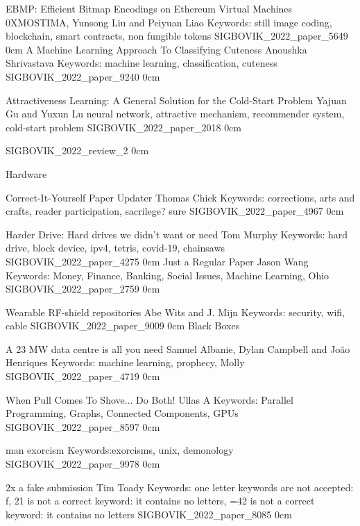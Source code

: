 \addpaper
    {EBMP: Efficient Bitmap Encodings on Ethereum Virtual Machines}
    {0XMOSTIMA, Yunsong Liu and Peiyuan Liao}
    {Keywords: still image coding, blockchain, smart contracts, non fungible tokens}
    {SIGBOVIK_2022_paper_5649}
    {0cm}
    {}
\addpaper
    {A Machine Learning Approach To Classifying Cuteness}
    {Anoushka Shrivastava}
    {Keywords: machine learning, classification, cuteness}
    {SIGBOVIK_2022_paper_9240}
    {0cm}
    {}

\addpaper
    {Attractiveness Learning: A General Solution for the Cold-Start Problem}
    {Yajuan Gu and Yuxun Lu}
    {neural network, attractive mechanism, recommender system, cold-start problem}
    {SIGBOVIK_2022_paper_2018}
    {0cm}
    {}

\addreview
    {SIGBOVIK_2022_review_2}
    {0cm}

\addtrack
    {}{Hardware}

\addpaper
    {Correct-It-Yourself Paper Updater}
    {Thomas Chick}
    {Keywords: corrections, arts and crafts, reader participation, sacrilege? sure}
    {SIGBOVIK_2022_paper_4967}
    {0cm}
    {}

\addpaper
    {Harder Drive: Hard drives we didn't want or need}
    {Tom Murphy}
    {Keywords: hard drive, block device, ipv4, tetris, covid-19, chainsaws}
    {SIGBOVIK_2022_paper_4275}
    {0cm}
    {}
\addpaper
    {Just a Regular Paper}
    {Jason Wang}
    {Keywords: Money, Finance, Banking, Social Issues, Machine Learning, Ohio}
    {SIGBOVIK_2022_paper_2759}
    {0cm}
    {}


\addpaper
    {Wearable RF-shield repositories}
    {Abe Wits and J. Mijn}
    {Keywords: security, wifi, cable}
    {SIGBOVIK_2022_paper_9009}
    {0cm}
    {}
\addtrack
    {}{Black Boxes}

\addpaper
    {A 23 MW data centre is all you need}
    {Samuel Albanie, Dylan Campbell and João Henriques}
    {Keywords: machine learning, prophecy, Molly}
    {SIGBOVIK_2022_paper_4719}
    {0cm}
    {}


\addpaper
    {When Pull Comes To Shove... Do Both!}
    {Ullas A}
    {Keywords: Parallel Programming, Graphs, Connected Components, GPUs}
    {SIGBOVIK_2022_paper_8597}
    {0cm}
    {}


\addpaper
    {man exorcism}
    {}
    {Keywords:exorcisms, unix, demonology}
    {SIGBOVIK_2022_paper_9978}
    {0cm}
    {}

\addpaper
    {2x a fake submission}
    {Tim Toady}
    {Keywords: one letter keywords are not accepted: f, 21 is not a correct keyword: it contains no letters, =42 is not a correct keyword: it contains no letters}
    {SIGBOVIK_2022_paper_8085}
    {0cm}
    {}

